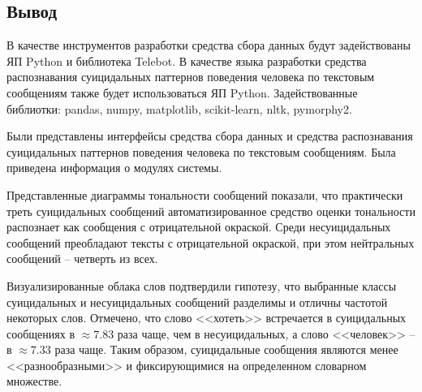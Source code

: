 \subsection*{Вывод}

В качестве инструментов разработки средства сбора данных будут задействованы ЯП Python и библиотека Telebot. 
В качестве языка разработки средства распознавания суицидальных паттернов поведения человека по текстовым сообщениям также будет использоваться ЯП Python. 
Задействованные библиотки: pandas, numpy, matplotlib, scikit-learn, nltk, pymorphy2.

Были представлены интерфейсы средства сбора данных и средства распознавания суицидальных паттернов поведения человека по текстовым сообщениям.
Была приведена информация о модулях системы.

Представленные диаграммы тональности сообщений показали, что практически треть суицидальных сообщений автоматизированное средство оценки тональности распознает как сообщения с отрицательной окраской. 
Среди несуицидальных сообщений преобладают тексты с отрицательной окраской, при этом нейтральных сообщений -- четверть из всех.

Визуализированные облака слов подтвердили гипотезу, что выбранные классы суицидальных и несуицидальных сообщений разделимы и отличны частотой некоторых слов. 
Отмечено, что слово <<хотеть>> встречается в суицидальных сообщениях в $\approx 7.83$ раза чаще, чем в несуицидальных, а слово <<человек>> -- в $\approx 7.33$ раза чаще. 
Таким образом, суицидальные сообщения являются менее <<разнообразными>> и фиксирующимися на определенном словарном множестве.
